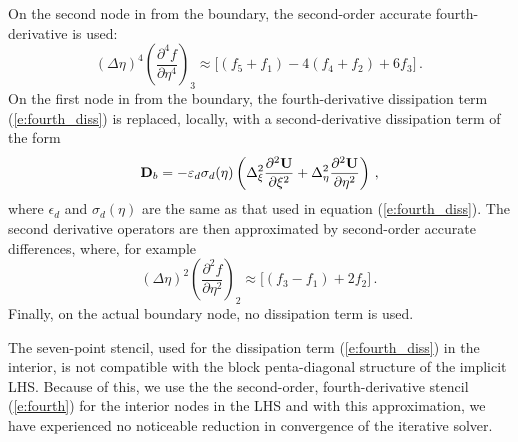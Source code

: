 On the second node in from the boundary, the second-order accurate
fourth-derivative is used:
%
\begin{equation} \label{e:fourth}
 (\Delta\eta)^4 \left( \frac{\partial^4 f}{\partial \eta^4} \right)_3 \approx 
 \Big[   \left( f_{5} + f_{1} \right) -
       4 \left( f_{4} + f_{2} \right) +
       6 f_{3} \Big] \period
\end{equation}
%
On the first node in from the boundary, the fourth-derivative dissipation term
(\ref{e:fourth_diss}) is replaced, locally, with a second-derivative
dissipation term of the form
%
\begin{equation}
  {\bf D}_b = -\varepsilon_d \sigma_d(\eta) \left( 
          \Delta_\xi^2  \frac{\partial^2 {\bf U}}{\partial \xi^2} + 
          \Delta_\eta^2 \frac{\partial^2 {\bf U}}{\partial \eta^2} \right) {\, ,}
\end{equation}
%
where $\epsilon_d$ and $\sigma_d(\eta)$ are the same as that used in equation
(\ref{e:fourth_diss}).  The second derivative operators are then approximated
by second-order accurate differences, where, for example
%
\begin{equation} 
 (\Delta\eta)^2 \left( \frac{\partial^2 f}{\partial \eta^2} \right)_2 \approx  
 \Big[ \left( f_{3} - f_{1} \right) + 2 f_{2} \Big] \period
\end{equation}
%
Finally, on the actual boundary node, no dissipation term is used.

The seven-point stencil, used for the dissipation term (\ref{e:fourth_diss}) in
the interior, is not compatible with the block penta-diagonal structure of the
implicit LHS.  Because of this, we use the the second-order, fourth-derivative
stencil (\ref{e:fourth}) for the interior nodes in the LHS and with this
approximation, we have experienced no noticeable reduction in convergence of
the iterative solver.

